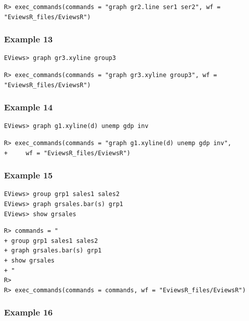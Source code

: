 \begin{verbatim}
R> exec_commands(commands = "graph gr2.line ser1 ser2", wf = "EviewsR_files/EviewsR")
\end{verbatim}

\hypertarget{example-13}{%
\subsubsection{Example 13}\label{example-13}}

\begin{verbatim}
EViews> graph gr3.xyline group3
\end{verbatim}

\begin{verbatim}
R> exec_commands(commands = "graph gr3.xyline group3", wf = "EviewsR_files/EviewsR")
\end{verbatim}

\hypertarget{example-14}{%
\subsubsection{Example 14}\label{example-14}}

\begin{verbatim}
EViews> graph g1.xyline(d) unemp gdp inv
\end{verbatim}

\begin{verbatim}
R> exec_commands(commands = "graph g1.xyline(d) unemp gdp inv",
+     wf = "EviewsR_files/EviewsR")
\end{verbatim}

\hypertarget{example-15}{%
\subsubsection{Example 15}\label{example-15}}

\begin{verbatim}
EViews> group grp1 sales1 sales2
EViews> graph grsales.bar(s) grp1
EViews> show grsales
\end{verbatim}

\begin{verbatim}
R> commands = "
+ group grp1 sales1 sales2
+ graph grsales.bar(s) grp1
+ show grsales
+ "
R> 
R> exec_commands(commands = commands, wf = "EviewsR_files/EviewsR")
\end{verbatim}

\hypertarget{example-16}{%
\subsubsection{Example 16}\label{example-16}}

